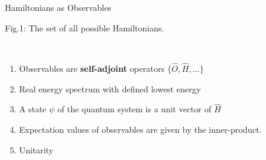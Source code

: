 \documentclass[10pt]{beamer}
\begin{document}
\begin{frame}{Hamiltonians as Observables}
    \\
    \hspace{1em}
    \begin{tiny}
        Fig.1: The set of all possible Hamiltonians.
    \end{tiny}
    \\
    \begin{enumerate}
        \item \textcolor{myNewColorA}{Observables are \textbf{self-adjoint} operators $\{\hat{O}, \hat{H}, ...\}$}
        \item \textcolor{myNewColorC}{Real energy spectrum with defined lowest energy}
        \item \textcolor{myNewColorC}{A state $\psi$ of the quantum system is a unit vector of $\hat{H}$}
        \item \textcolor{myNewColorC}{Expectation values of observables are given by the inner-product.}
        \item \textcolor{myNewColorC}{Unitarity}
    \end{enumerate}
\end{frame}
\end{document}
